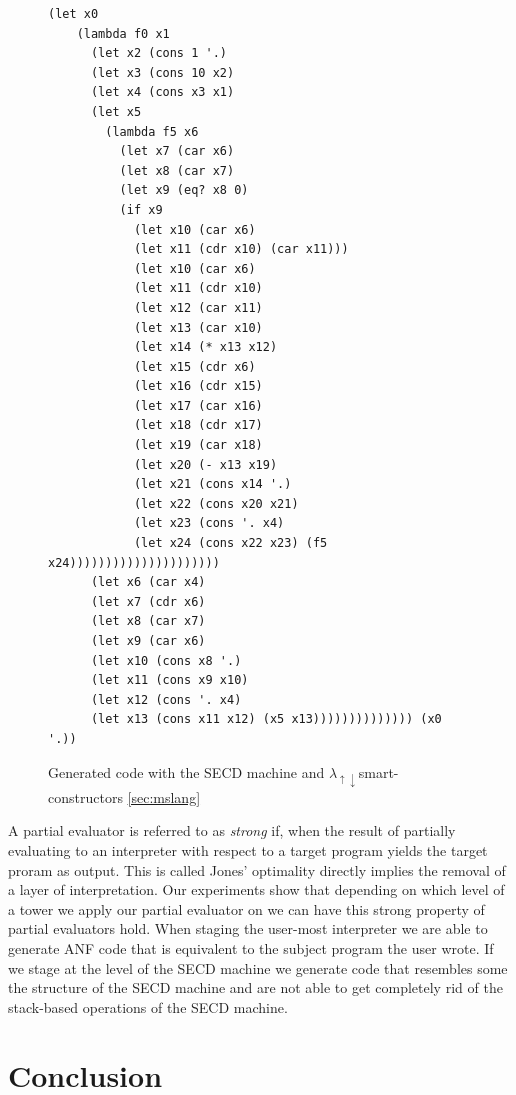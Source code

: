 \documentclass[fleqn]{article}
\theoremstyle{definition}
\newcommand{\mslang}{$\lambda_{\uparrow\downarrow}$}
\begin{document}
\begin{figure}[h]
\centering
\begin{verbatim}
(let x0
	(lambda f0 x1
	  (let x2 (cons 1 '.)
	  (let x3 (cons 10 x2)
	  (let x4 (cons x3 x1)
	  (let x5
		(lambda f5 x6
		  (let x7 (car x6)
		  (let x8 (car x7)
		  (let x9 (eq? x8 0)
		  (if x9
			(let x10 (car x6)
			(let x11 (cdr x10) (car x11)))
			(let x10 (car x6)
			(let x11 (cdr x10)
			(let x12 (car x11)
			(let x13 (car x10)
			(let x14 (* x13 x12)
			(let x15 (cdr x6)
			(let x16 (cdr x15)
			(let x17 (car x16)
			(let x18 (cdr x17)
			(let x19 (car x18)
			(let x20 (- x13 x19)
			(let x21 (cons x14 '.)
			(let x22 (cons x20 x21)
			(let x23 (cons '. x4)
			(let x24 (cons x22 x23) (f5 x24)))))))))))))))))))))
	  (let x6 (car x4)
	  (let x7 (cdr x6)
	  (let x8 (car x7)
	  (let x9 (car x6)
	  (let x10 (cons x8 '.)
	  (let x11 (cons x9 x10)
	  (let x12 (cons '. x4)
	  (let x13 (cons x11 x12) (x5 x13)))))))))))))) (x0 '.))
\end{verbatim}
\caption{Generated code with the SECD machine and \mslang smart-constructors \ref{sec:mslang}}
\label{lst:secd_factorial}
\end{figure}

A partial evaluator is referred to as \textit{strong} if, when the result of partially evaluating to an interpreter with respect to a target program yields the target proram as output. This is called Jones' optimality directly implies the removal of a layer of interpretation. Our experiments show that depending on which level of a tower we apply our partial evaluator on we can have this strong property of partial evaluators hold. When staging the user-most interpreter we are able to generate ANF code that is equivalent to the subject program the user wrote. If we stage at the level of the SECD machine we generate code that resembles some the structure of the SECD machine and are not able to get completely rid of the stack-based operations of the SECD machine.

\section{Conclusion}
\end{document}
